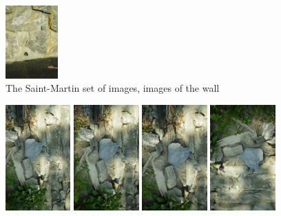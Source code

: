 \begin{figure}[H]
\begin{center}
\includegraphics[height=28mm]{FIGS/MurSaintMartin/Small-IMGP4174.JPG}
\end{center}
\caption{The Saint-Martin set of images, images of the wall}
\label{FIG:StM:Mur}
\end{figure}


\begin{figure}[H]
\begin{center}
\includegraphics[width=25mm]{FIGS/MurSaintMartin/Small-IMGP4160.JPG}
\includegraphics[width=25mm]{FIGS/MurSaintMartin/Small-IMGP4161.JPG}
\includegraphics[width=25mm]{FIGS/MurSaintMartin/Small-IMGP4162.JPG}
\includegraphics[width=25mm]{FIGS/MurSaintMartin/Small-IMGP4163.JPG}

\end{center}
\end{figure}
